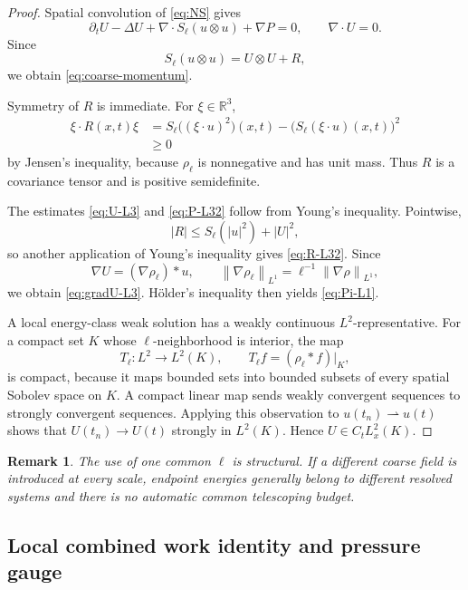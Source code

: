 \documentclass[10pt,a4paper]{amsart}
\numberwithin{equation}{section}
\newtheorem{remark}[theorem]{Remark}
\newcommand{\R}{\mathbb R}
\newcommand{\norm}[2]{\left\lVert #1\right\rVert_{#2}}
\begin{document}
\begin{proof}
Spatial convolution of \eqref{eq:NS} gives
\[
\partial_tU-\Delta U+\nabla\cdot S_\ell(u\otimes u)+\nabla P=0,
\qquad
\nabla\cdot U=0.
\]
Since
\[
S_\ell(u\otimes u)=U\otimes U+R,
\]
we obtain \eqref{eq:coarse-momentum}.

Symmetry of \(R\) is immediate. For \(\xi\in\R^3\),
\begin{align*}
\xi\cdot R(x,t)\xi
&=
S_\ell\bigl((\xi\cdot u)^2\bigr)(x,t)
-
\bigl(S_\ell(\xi\cdot u)(x,t)\bigr)^2
\\
&\ge0
\end{align*}
by Jensen's inequality, because \(\rho_\ell\) is nonnegative and has unit mass. Thus \(R\) is a covariance tensor and is positive semidefinite.

The estimates \eqref{eq:U-L3} and \eqref{eq:P-L32} follow from Young's inequality. Pointwise,
\[
|R|
\le
S_\ell(|u|^2)+|U|^2,
\]
so another application of Young's inequality gives \eqref{eq:R-L32}. Since
\[
\nabla U=(\nabla\rho_\ell)*u,
\qquad
\norm{\nabla\rho_\ell}{L^1}
=\ell^{-1}\norm{\nabla\rho}{L^1},
\]
we obtain \eqref{eq:gradU-L3}. H\"older's inequality then yields \eqref{eq:Pi-L1}.

A local energy-class weak solution has a weakly continuous \(L^2\)-representative. For a compact set \(K\) whose \(\ell\)-neighborhood is interior, the map
\[
T_\ell:L^2\longrightarrow L^2(K),
\qquad
T_\ell f=(\rho_\ell*f)|_K,
\]
is compact, because it maps bounded sets into bounded subsets of every spatial Sobolev space on \(K\). A compact linear map sends weakly convergent sequences to strongly convergent sequences. Applying this observation to \(u(t_n)\rightharpoonup u(t)\) shows that \(U(t_n)\to U(t)\) strongly in \(L^2(K)\). Hence \(U\in C_tL^2_x(K)\).
\end{proof}

\begin{remark}
The use of one common \(\ell\) is structural. If a different coarse field is introduced at every scale, endpoint energies generally belong to different resolved systems and there is no automatic common telescoping budget.
\end{remark}

\subsection{Local combined work identity and pressure gauge}\label{sec:identity}
\end{document}
